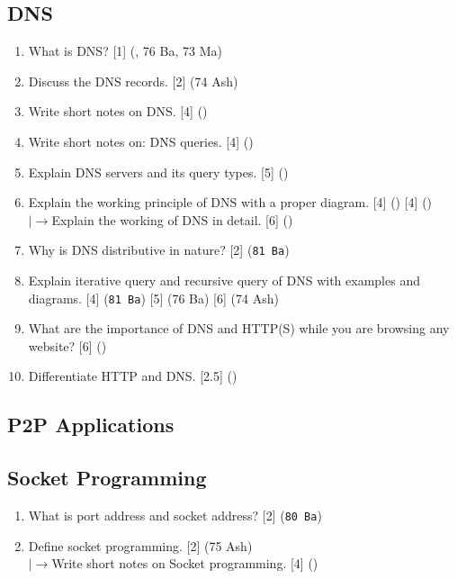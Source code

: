 \documentclass[12pt]{article}
\newcommand{\lb}{\\$\left|\rightarrow\right.$}
\begin{document}
	\subsection{DNS}
		\begin{enumerate}[noitemsep, topsep=0pt]
			\item What is DNS? \hfill [1] (, 76 Ba, 73 Ma)

			\item Discuss the DNS records. \hfill [2] (74 Ash)

			\item Write short notes on DNS. \hfill [4] ()

			\item Write short notes on: DNS queries. \hfill [4] ()

			\item Explain DNS servers and its query types. \hfill [5] ()

			\item Explain the working principle of DNS with a proper diagram. \hfill [4] () [4] ()
			\lb Explain the working of DNS in detail. \hfill [6] ()
			
			\item Why is DNS distributive in nature? \hfill [2] (\texttt{81 Ba})

			\item Explain iterative query and recursive query of DNS with examples and diagrams. \hfill [4] (\texttt{81 Ba}) [5] (76 Ba) [6] (74 Ash)
 
			\item What are the importance of DNS and HTTP(S) while you are browsing any website? \hfill [6] ()

			\item Differentiate HTTP and DNS. \hfill [2.5] ()
		\end{enumerate}

	\subsection{P2P Applications}
	\subsection{Socket Programming}
		\begin{enumerate}[noitemsep, topsep=0pt]
			\item What is port address and socket address? \hfill [2] (\texttt{80 Ba})

			\item Define socket programming. \hfill [2] (75 Ash)
			\lb Write short notes on Socket programming. \hfill [4] ()
		\end{enumerate}
\end{document}
